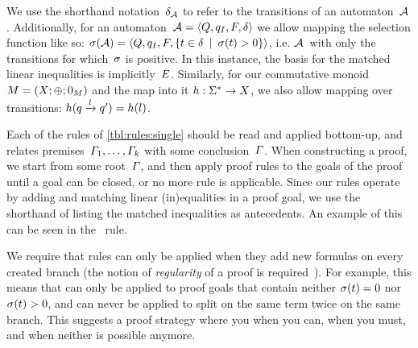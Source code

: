 \documentclass[acmsmall,review,anonymous,screen]{acmart}\settopmatter{printfolios=true,printccs=false,printacmref=true}
\theoremstyle{definition}
\begin{document}
We use the shorthand notation~$\delta_{\mathcal{A}}$ to refer to the
transitions of an automaton~$\mathcal{A}$. Additionally, for an
automaton~$\mathcal{A} = \left\langle Q, q_I, F, \delta\right\rangle$ we allow mapping the selection function
like so: $\operatorname{\sigma}(\mathcal{A}) = \left\langle Q, q_I, F,
\left\{t \in \delta \:\mid\: \operatorname{\sigma}(t) > 0\right\}\right\rangle$, i.e.
$\mathcal{A}$~with only the transitions for which~$\operatorname{\sigma}$ is positive. In this
instance, the basis for the matched linear inequalities is
implicitly~$E$. Similarly, for our commutative monoid $M =
\left(X;\operatorname{\oplus};0_{M}\right)$ and the map into it $h : \Sigma^*
\rightarrow X$, we also allow mapping over transitions:
$h(q \xrightarrow{l} q') = h(l)$.

Each of the rules of \cref{tbl:rules:single} should be read and
applied bottom-up, and relates
premises~$\varGamma_1, \ldots, \varGamma_k$ with some
conclusion~$\varGamma$. When constructing a proof, we start from some
root~$\varGamma$, and then apply proof rules to the goals of the proof
until a goal can be closed, or no more rule is applicable. Since
our rules operate by adding and matching linear (in)equalities in a proof goal,
we use the shorthand of listing the matched inequalities as antecedents. An
example of this can be seen in the~\Propagate{} rule. 

We require that rules can only be applied when they add new formulas
on every created branch (the notion of \emph{regularity} of a proof is
required~\cite{Fitting96a}). For example, this means that \Split{} can
only be applied to proof goals that contain neither
$\operatorname{\sigma}(t) = 0$ nor $\operatorname{\sigma}(t) > 0$, and can
never be applied to split on the same term twice on the same branch.
This suggests a proof strategy where you \Propagate{} when you can, \Split{}
when you must, and \Subsume{} when neither is possible anymore.
\end{document}
